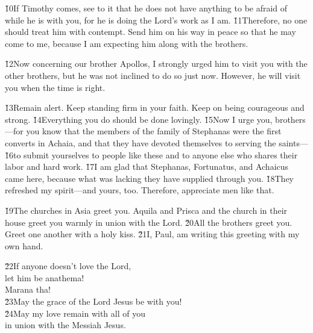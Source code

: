 \v{10}If Timothy comes, see to it that he does not have anything to be afraid of while he is with you, for he is doing the Lord's work as I am. \v{11}Therefore, no one should treat him with contempt. Send him on his way in peace so that he may come to me, because I am expecting him along with the brothers.

\v{12}Now concerning our brother Apollos, I strongly urged him to visit you with the other brothers, but he was not inclined to do so just now. However, he will visit you when the time is right.

\v{13}Remain alert. Keep standing firm in your faith. Keep on being courageous and strong. \v{14}Everything you do should be done lovingly. \v{15}Now I urge you, brothers---for you know that the members of the family of Stephanas were the first converts in Achaia, and that they have devoted themselves to serving the saints--- \v{16}to submit yourselves to people like these and to anyone else who shares their labor and hard work. \v{17}I am glad that Stephanas, Fortunatus, and Achaicus came here, because what was lacking they have supplied through you. \v{18}They refreshed my spirit---and yours, too. Therefore, appreciate men like that.

\v{19}The churches in Asia greet you. Aquila and Prisca and the church in their house greet you warmly in union with the Lord. \v{20}All the brothers greet you. Greet one another with a holy kiss. \v{21}I, Paul, am writing this greeting with my own hand.

\begin{poetry}
\poeml \v{22}If anyone doesn't love the Lord, \\
\poemll    let him be anathema! \\
\poemlll       Marana tha! \\
\poeml \v{23}May the grace of the Lord Jesus be with you! \\
\poeml \v{24}May my love remain with all of you \\
\poemll    in union with the Messiah Jesus.\end{poetry}
